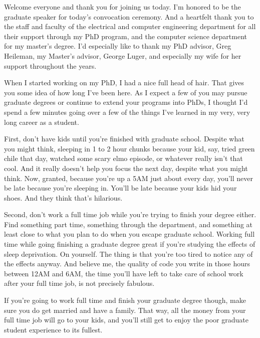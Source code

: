 \documentclass[10pt,letterpaper]{letter}
\begin{document}
Welcome everyone and thank you for joining us today.   I'm honored to be the graduate speaker for today's convocation ceremony.  And a heartfelt thank you to the staff and faculty of the electrical and computer engineering department for all their support through my PhD program, and the computer science department for my master's degree.  I'd especially like to thank my PhD advisor, Greg Heileman, my Master's advisor, George Luger, and especially my wife for her support throughout the years.

When I started working on my PhD, I had a nice full head of hair.  That gives you some idea of how long I've been here.  As I expect a few of you may pursue graduate degrees or continue to extend your programs into PhDs, I thought I'd spend a few minutes going over a few of the things I've learned in my very, very long career as a student.

First, don't have kids until you're finished with graduate school. Despite what you might think, sleeping in 1 to 2 hour chunks because your kid, say, tried green chile that day, watched some scary elmo episode, or whatever really isn't that cool.  And it really doesn't help you focus the next day, despite what you might think.  Now, granted, because you're up a 5AM just about every day, you'll never be late because you're sleeping in.  You'll be late because your kids hid your shoes.  And they think that's hilarious.

Second, don't work a full time job while you're trying to finish your degree either.  Find something part time, something through the department, and something at least close to what you plan to do when you escape graduate school.  Working full time while going finishing a graduate degree great if you're studying the effects of sleep deprivation.  On yourself.  The thing is that you're too tired to notice any of the effects anyway.  And believe me, the quality of code you write in those hours between 12AM and 6AM, the time you'll have left to take care of school work after your full time job, is not precisely fabulous.

If you're going to work full time and finish your graduate degree though, make sure you do get married and have a family.  That way, all the money from your full time job will go to your kids, and you'll still get to enjoy the poor graduate student experience to its fullest.
\end{document}

